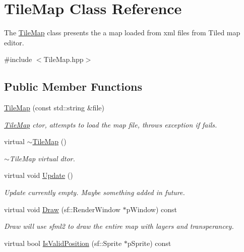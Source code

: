 \hypertarget{class_tile_map}{\section{Tile\-Map Class Reference}
\label{class_tile_map}
}


The \hyperlink{class_tile_map}{Tile\-Map} class presents the a map loaded from xml files from Tiled map editor.  




{\ttfamily \#include $<$Tile\-Map.\-hpp$>$}

\subsection*{Public Member Functions}
\begin{DoxyCompactItemize}
\item 
\hyperlink{class_tile_map_a4914f83099a0cd9b71b0ab9a665956c5}{Tile\-Map} (const std\-::string \&file)
\begin{DoxyCompactList}\small\item\em \hyperlink{class_tile_map}{Tile\-Map} ctor, attempts to load the map file, throws exception if fails. \end{DoxyCompactList}\item 
virtual \hyperlink{class_tile_map_a3448728e45d6a43fff3a02d4c6d72e9d}{$\sim$\-Tile\-Map} ()
\begin{DoxyCompactList}\small\item\em $\sim$\-Tile\-Map virtual dtor. \end{DoxyCompactList}\item 
virtual void \hyperlink{class_tile_map_a03106c4fd480ab81782778a28af5484f}{Update} ()
\begin{DoxyCompactList}\small\item\em Update currently empty. Maybe something added in future. \end{DoxyCompactList}\item 
virtual void \hyperlink{class_tile_map_adc7449af6dab5033f9af54b85f2dd8b1}{Draw} (sf\-::\-Render\-Window $\ast$p\-Window) const 
\begin{DoxyCompactList}\small\item\em Draw will use sfml2 to draw the entire map with layers and transperancey. \end{DoxyCompactList}\item 
virtual bool \hyperlink{class_tile_map_abf04fac57f31135e607b0cd23bb4de1c}{Is\-Valid\-Position} (sf\-::\-Sprite $\ast$p\-Sprite) const 

\end{DoxyCompactItemize}
